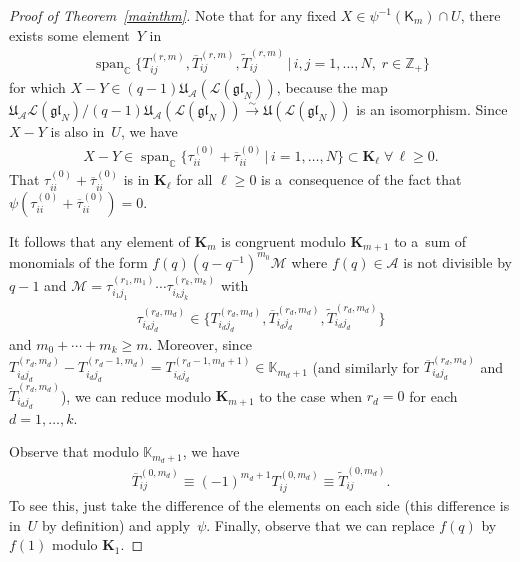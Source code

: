 \documentclass[pdftex]{sigma}
\numberwithin{theorem}{section}
\numberwithin{proposition}{section}
\numberwithin{lemma}{section}
\numberwithin{corollary}{section}
\numberwithin{definition}{section}
\numberwithin{example}{section}
\numberwithin{remark}{section}
\numberwithin{note}{section}
\numberwithin{equation}{section}
\begin{document}
\begin{proof}[Proof of Theorem~\ref{mainthm}]
Note that for any f\/ixed $X \in \psi^{-1}(\mathsf{K}_m) \cap U$, there exists some element~$Y$ in
 \begin{gather*}
\operatorname{span}_{\mathbb{C}}\big\{T_{ij}^{(r,m)},\overline{T}_{ij}^{(r,m)},\widetilde{T}_{ij}^{(r,m)} \,|\, i,j=1,\ldots,N,\; r \in
\mathbb{Z}_+\big\}
\end{gather*}
for which $X-Y \in (q-1)\mathfrak{U}_{\mathcal{A}}(\mathcal{L}(\mathfrak{gl}_N))$, because the map
$\mathfrak{U}_{\mathcal{A}}\mathcal{L}(\mathfrak{gl}_N)
/(q-1)\mathfrak{U}_{\mathcal{A}}(\mathcal{L}(\mathfrak{gl}_N))
\stackrel{\sim}{\longrightarrow} \mathfrak{U}(\mathcal{L}(\mathfrak{gl}_N))$ is an isomorphism.
Since $X-Y$ is also in~$U$, we have{\samepage
\begin{gather*}
X-Y \in \operatorname{span}_{\mathbb{C}} \big\{\tau_{ii}^{(0)}+\overline{\tau}_{ii}^{(0)} \,|\, i=1,\ldots,N\big\} \subset \mathbf{K}_{\ell}
 \; \forall\, \ell \geq 0.
\end{gather*}
That $\tau_{ii}^{(0)}+\overline{\tau}_{ii}^{(0)}$ is in $\mathbf{K}_{\ell}$ for all $\ell \geq 0$ is a~consequence of the
fact that $\psi(\tau_{ii}^{(0)}+\overline{\tau}_{ii}^{(0)})=0$.}

It follows that any element of $\mathbf{K}_m$ is congruent modulo $\mathbf{K}_{m+1}$ to a~sum of monomials of the form
$f(q)(q-q^{-1})^{m_0}\mathcal{M}$ where $f(q) \in \mathcal{A}$ is not divisible by $q-1$ and $\mathcal{M}=\tau_{i_1
j_1}^{(r_1,m_1)} \cdots \tau_{i_k j_k}^{(r_k,m_k)}$ with
\begin{gather*}
\tau_{i_d j_d}^{(r_d,m_d)} \in \big\{T_{i_d j_d}^{(r_d,m_d)}, \overline{T}_{i_d j_d}^{(r_d,m_d)}, \widetilde{T}_{i_d
j_d}^{(r_d,m_d)}\big\}
\end{gather*}
and $m_0+\cdots+m_k \geq m$.
Moreover, since $T_{i_d j_d}^{(r_d,m_d)}-T_{i_d j_d}^{(r_d-1,m_d)}=T_{i_d j_d}^{(r_d-1,m_d+1)} \in \mathbb{K}_{m_d+1}$
(and similarly for $\overline{T}_{i_d j_d}^{(r_d,m_d)}$ and $\widetilde{T}_{i_d j_d}^{(r_d,m_d)}$), we can reduce modulo
$\mathbf{K}_{m+1}$ to the case when $r_d=0$ for each $d=1,\ldots,k$.

Observe that modulo $\mathbb{K}_{m_d+1}$, we have
\begin{gather}
\overline{T}_{ij}^{(0,m_d)} \equiv (-1)^{m_d+1}T_{ij}^{(0,m_d)} \equiv \widetilde{T}_{ij}^{(0,m_d)}.
\label{TbarT}
\end{gather}
To see this, just take the dif\/ference of the elements on each side (this dif\/ference is in~$U$ by def\/inition) and
apply~$\psi$.
Finally, observe that we can replace $f(q)$ by $f(1)$ modulo $\mathbf{K}_{1}$.


\end{proof}
\end{document}
